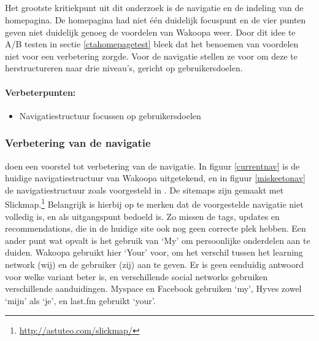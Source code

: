 \documentclass[a4paper, 10pt, pdftex]{report}
\begin{document}
    \subsection{\cite{Hoekman2008}}
    Het grootste kritiekpunt uit dit onderzoek is de navigatie en de indeling van de homepagina. De homepagina had niet \'e\'en duidelijk focuspunt en de vier punten geven niet duidelijk genoeg de voordelen van Wakoopa weer. Door dit idee te A/B testen in sectie \ref{ctahomepagetest} bleek dat het benoemen van voordelen niet voor een verbetering zorgde. Voor de navigatie stellen ze voor om deze te herstructureren naar drie niveau's, gericht op gebruikersdoelen.

    \paragraph{\textbf{Verbeterpunten:}}
      \begin{itemize}
        \item Navigatiestructuur focussen op gebruikersdoelen
      \end{itemize}

    \subsubsection{Verbetering van de navigatie}
      \citeauthor{Hoekman2008} doen een voorstel tot verbetering van de navigatie. In figuur \ref{currentnav} is de huidige navigatiestructuur van Wakoopa uitgetekend, en in figuur \ref{miskeetonav} de navigatiestructuur zoals voorgesteld in  \cite{Hoekman2008}. De sitemaps zijn gemaakt met Slickmap.\footnote{\url{http://astuteo.com/slickmap/}} Belangrijk is hierbij op te merken dat de voorgestelde navigatie niet volledig is, en als uitgangspunt bedoeld is. Zo missen de tags, updates en recommendations, die in de huidige site ook nog geen correcte plek hebben. Een ander punt wat opvalt is het gebruik van `My' om persoonlijke onderdelen aan te duiden. Wakoopa gebruikt hier `Your' voor, om het verschil tussen het learning network (wij) en de gebruiker (zij) aan te geven. Er is geen eenduidig antwoord voor welke variant beter is, en verschillende social networks gebruiken verschillende aanduidingen. Myspace en Facebook gebruiken `my', Hyves zowel `mijn' als `je', en last.fm gebruikt `your'.
\end{document}
